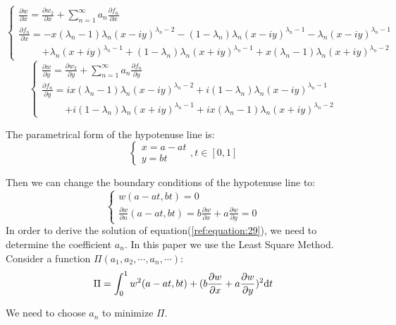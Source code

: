 \documentclass[a4paper]{article}      %
\begin{document}
\begin{equation}\label{ref:equation:31}
\left\{ {\begin{array}{*{20}{l}}
{\frac{\partial w}{\partial x}=\frac{\partial w_2}{\partial x}+\sum_{n=1}^{\infty}{a_n \frac{\partial f_n}{\partial x}}}\\
{\frac{\partial f_n}{\partial x}=-x \left(\lambda _n-1\right) \lambda _n (x-i y)^{\lambda _n-2}-\left(1-\lambda
   _n\right) \lambda _n (x-i y)^{\lambda _n-1}-\lambda _n (x-i y)^{\lambda
   _n-1}}\\
\hspace{1cm}{+\lambda _n (x+i y)^{\lambda _n-1}+\left(1-\lambda _n\right) \lambda _n (x+i
   y)^{\lambda _n-1}+x \left(\lambda _n-1\right) \lambda _n (x+i y)^{\lambda _n-2}}
\end{array}} \right.
\end{equation}
\begin{equation}\label{ref:equation:32}
\left\{ {\begin{array}{*{20}{l}}
{\frac{\partial w}{\partial y}=\frac{\partial w_2}{\partial y}+\sum_{n=1}^{\infty}{a_n \frac{\partial f_n}{\partial y}}}\\
{\frac{\partial f_n}{\partial y}=i x \left(\lambda _n-1\right) \lambda _n (x-i y)^{\lambda _n-2}+i \left(1-\lambda
   _n\right) \lambda _n (x-i y)^{\lambda _n-1}}\\
   \hspace{1cm}{+i \left(1-\lambda _n\right) \lambda
   _n (x+i y)^{\lambda _n-1}+i x \left(\lambda _n-1\right) \lambda _n (x+i
   y)^{\lambda _n-2}}
\end{array}} \right.
\end{equation}

The parametrical form of the hypotenuse line is:
    \begin{equation}\label{ref:equation:33}
    \left\{ {\begin{array}{*{20}{l}}
    {x=a-at}\\
    {y=bt}
    \end{array}}\right.,t\in[0,1]
    \end{equation}

Then we can change the boundary conditions of the hypotenuse line to:
    \begin{equation}\label{ref:equation:34}
    \left\{ {\begin{array}{*{20}{l}}
    {w(a-at,bt)=0}\\
    {\frac{\partial w}{\partial n}(a-at,bt)=b\frac{\partial w}{\partial x}+a\frac{\partial w}{\partial y}=0}
    \end{array}}\right.
    \end{equation}
    In order to derive the solution of equation(\ref{ref:equation:29}), we need to determine the coefficient $a_n$. In this paper we use the Least Square Method. Consider a function $\Pi(a_1,a_2,\cdots,a_n,\cdots)$:
    \begin{equation}\label{ref:equation:35}
    \Pi=\int_{0}^{1}w^2(a-at,bt)+(b\frac{\partial w}{\partial x}+a\frac{\partial w}{\partial y})^2 {\rm d}t
    \end{equation}

    We need to choose $a_n$ to minimize $\Pi$.
\end{document}

